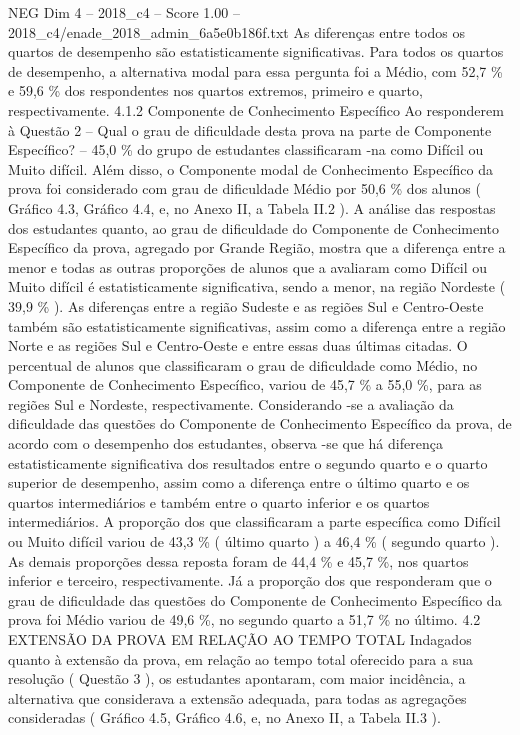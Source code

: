\begin{textsample}{NEG Dim 4 – 2018\_c4 – Score 1.00 – 2018\_c4/enade\_2018\_admin\_6a5e0b186f.txt}
As diferenças entre todos os quartos de desempenho são estatisticamente significativas.
Para todos os quartos de desempenho, a alternativa modal para essa pergunta foi a Médio, com 52,7 \% e 59,6 \% dos respondentes nos quartos extremos, primeiro e quarto, respectivamente. 4.1.2 Componente de Conhecimento Específico Ao responderem à Questão 2 – Qual o grau de dificuldade desta prova na parte de Componente Específico? – 45,0 \% do grupo de estudantes classificaram -na como Difícil ou Muito difícil.
Além disso, o Componente modal de Conhecimento Específico da prova foi considerado com grau de dificuldade Médio por 50,6 \% dos alunos ( Gráfico 4.3, Gráfico 4.4, e, no Anexo II, a Tabela II.2 ).
A análise das respostas dos estudantes quanto, ao grau de dificuldade do Componente de Conhecimento Específico da prova, agregado por Grande Região, mostra que a diferença entre a menor e todas as outras proporções de alunos que a avaliaram como Difícil ou Muito difícil é estatisticamente significativa, sendo a menor, na região Nordeste ( 39,9 \% ).
As diferenças entre a região Sudeste e as regiões Sul e Centro-Oeste também são estatisticamente significativas, assim como a diferença entre a região Norte e as regiões Sul e Centro-Oeste e entre essas duas últimas citadas.
O percentual de alunos que classificaram o grau de dificuldade como Médio, no Componente de Conhecimento Específico, variou de 45,7 \% a 55,0 \%, para as regiões Sul e Nordeste, respectivamente.
Considerando -se a avaliação da dificuldade das questões do Componente de Conhecimento Específico da prova, de acordo com o desempenho dos estudantes, observa -se que há diferença estatisticamente significativa dos resultados entre o segundo quarto e o quarto superior de desempenho, assim como a diferença entre o último quarto e os quartos intermediários e também entre o quarto inferior e os quartos intermediários.
A proporção dos que classificaram a parte específica como Difícil ou Muito difícil variou de 43,3 \% ( último quarto ) a 46,4 \% ( segundo quarto ).
As demais proporções dessa reposta foram de 44,4 \% e 45,7 \%, nos quartos inferior e terceiro, respectivamente.
Já a proporção dos que responderam que o grau de dificuldade das questões do Componente de Conhecimento Específico da prova foi Médio variou de 49,6 \%, no segundo quarto a 51,7 \% no último. 4.2 EXTENSÃO DA PROVA EM RELAÇÃO AO TEMPO TOTAL Indagados quanto à extensão da prova, em relação ao tempo total oferecido para a sua resolução ( Questão 3 ), os estudantes apontaram, com maior incidência, a alternativa que considerava a extensão adequada, para todas as agregações consideradas ( Gráfico 4.5, Gráfico 4.6, e, no Anexo II, a Tabela II.3 ).

\end{textsample}
